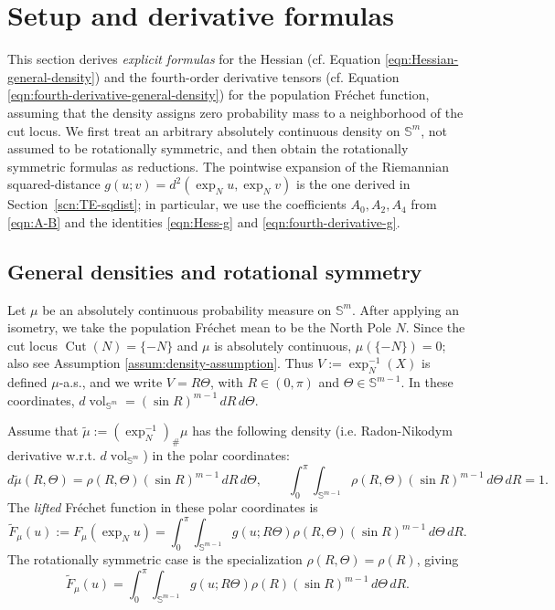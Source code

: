 \documentclass{amsart}
\theoremstyle{definition}
\theoremstyle{remark}
\newcommand\0{\boldsymbol{0}}
\begin{document}
\section{Setup and derivative formulas}
\label{scn:common-setup-derivatives}
\label{scn:support-rot-symm}
\label{scn:support-general-density}

This section derives \textit{explicit formulas} for the Hessian (cf. Equation \eqref{eqn:Hessian-general-density}) and the fourth-order derivative tensors (cf. Equation \eqref{eqn:fourth-derivative-general-density}) for the population Fréchet function, assuming that the density assigns zero probability mass to a neighborhood of the cut locus. We first treat an arbitrary absolutely continuous density on \(\mathbb S^m\), not assumed to be rotationally symmetric, and then obtain the rotationally symmetric formulas as reductions. The pointwise expansion of the Riemannian squared-distance \(g(u;v)=d^2(\exp_Nu,\exp_Nv)\) is the one derived in Section~\ref{scn:TE-sqdist}; in particular, we use the coefficients \(A_0,A_2,A_4\) from \eqref{eqn:A-B} and the identities \eqref{eqn:Hess-g} and \eqref{eqn:fourth-derivative-g}.

\subsection{General densities and rotational symmetry}
\label{scn:set-up}
\label{scn:set-up-general-density}

Let \(\mu\) be an absolutely continuous probability measure on \(\mathbb S^m\).  After applying an isometry, we take the population Fréchet mean to be the North Pole \(N\).  Since the cut locus \(\operatorname{Cut}(N)=\{-N\}\) and \(\mu\) is absolutely continuous, \(\mu(\{-N\})=0\); also see Assumption \ref{assum:density-assumption}.  Thus \(V:=\exp_N^{-1}(X)\) is defined \(\mu\)-a.s., and we write \(V=R\Theta\), with \(R\in(0,\pi)\) and \(\Theta\in\mathbb S^{m-1}\).  In these coordinates, \(d\operatorname{vol}_{\mathbb S^m}=(\sin R)^{m-1}\,dR\,d\Theta\).

Assume that \(\widetilde\mu:=(\exp_N^{-1})_\#\mu\) has the following density (i.e. Radon-Nikodym derivative w.r.t. $d\operatorname{vol}_{\mathbb S^m}$) in the polar coordinates:
\begin{equation}
\label{eqn:general-density-polar}
    d\widetilde\mu(R,\Theta)=\rho(R,\Theta)(\sin R)^{m-1}\,dR\,d\Theta,
    \qquad
    \int_0^\pi\!\!\int_{\mathbb S^{m-1}}\rho(R,\Theta)(\sin R)^{m-1}\,d\Theta\,dR=1 .
\end{equation}
The \textit{lifted} Fréchet function in these polar coordinates is
\begin{equation}\label{eqn:Frechet-general-polar}
    \widetilde F_\mu(u):=F_\mu(\exp_Nu)
    =
    \int_0^\pi\!\!\int_{\mathbb S^{m-1}}
    g(u;R\Theta)\rho(R,\Theta)(\sin R)^{m-1}\,d\Theta\,dR .
\end{equation}
The rotationally symmetric case is the specialization \(\rho(R,\Theta)=\rho(R)\), giving
\begin{equation}
\label{eqn:Fréchet-rot-symm-double-int}
    \widetilde F_\mu(u)
    =
    \int_0^\pi\!\!\int_{\mathbb S^{m-1}}
    g(u;R\Theta)\rho(R)(\sin R)^{m-1}\,d\Theta\,dR .
\end{equation}
\end{document}
